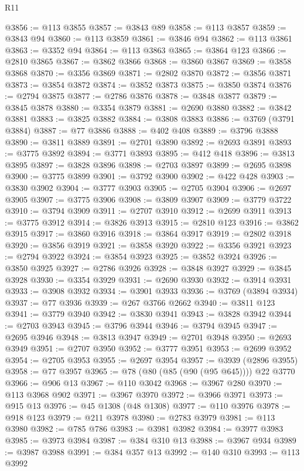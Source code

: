 \begin{lexlean}{R11}
\begin{coremodule}
{{{{{{{{{{{{{{{{{{{{{{{{{{{{{{{{{{{{{{{{{{{{{{{{{{{{{{{{{{{{{{{{{{{{{{{{{{{{{{{{{{{{{{{{{{{{{{{{{{{{{{{{{{@3856 := @113 @3855
@3857 := @3843 @89
@3858 := @113 @3857
@3859 := @3843 @94
@3860 := @113 @3859
@3861 := @3846 @94
@3862 := @113 @3861
@3863 := @3352 @94
@3864 := @113 @3863
@3865 := @3864 @123
@3866 := @2810 @3865
@3867 := @3862 @3866
@3868 := @3860 @3867
@3869 := @3858 @3868
@3870 := @3356 @3869
@3871 := @2802 @3870
@3872 := @3856 @3871
@3873 := @3854 @3872
@3874 := @3852 @3873
@3875 := @3850 @3874
@3876 := @2794 @3875
@3877 := @2786 @3876
@3878 := @3848 @3877
@3879 := @3845 @3878
@3880 := @3354 @3879
@3881 := @2690 @3880
@3882 := @3842 @3881
@3883 := @3825 @3882
@3884 := @3808 @3883
@3886 := @3769 (@3791 @3884)
@3887 := @77 @3886
@3888 := @402 @408
@3889 := @3796 @3888
@3890 := @3811 @3889
@3891 := @2701 @3890
@3892 := @2693 @3891
@3893 := @3775 @3892
@3894 := @3771 @3893
@3895 := @412 @418
@3896 := @3813 @3895
@3897 := @3828 @3896
@3898 := @2703 @3897
@3899 := @2695 @3898
@3900 := @3775 @3899
@3901 := @3792 @3900
@3902 := @422 @428
@3903 := @3830 @3902
@3904 := @3777 @3903
@3905 := @2705 @3904
@3906 := @2697 @3905
@3907 := @3775 @3906
@3908 := @3809 @3907
@3909 := @3779 @3722
@3910 := @3794 @3909
@3911 := @2707 @3910
@3912 := @2699 @3911
@3913 := @3775 @3912
@3914 := @3826 @3913
@3915 := @2810 @123
@3916 := @3862 @3915
@3917 := @3860 @3916
@3918 := @3864 @3917
@3919 := @2802 @3918
@3920 := @3856 @3919
@3921 := @3858 @3920
@3922 := @3356 @3921
@3923 := @2794 @3922
@3924 := @3854 @3923
@3925 := @3852 @3924
@3926 := @3850 @3925
@3927 := @2786 @3926
@3928 := @3848 @3927
@3929 := @3845 @3928
@3930 := @3354 @3929
@3931 := @2690 @3930
@3932 := @3914 @3931
@3933 := @3908 @3932
@3934 := @3901 @3933
@3936 := @3769 (@3894 @3934)
@3937 := @77 @3936
@3939 := @267 @3766 @2662
@3940 := @3811 @123
@3941 := @3779 @3940
@3942 := @3830 @3941
@3943 := @3828 @3942
@3944 := @2703 @3943
@3945 := @3796 @3944
@3946 := @3794 @3945
@3947 := @2695 @3946
@3948 := @3813 @3947
@3949 := @2701 @3948
@3950 := @2693 @3949
@3951 := @2707 @3950
@3952 := @3777 @3951
@3953 := @2699 @3952
@3954 := @2705 @3953
@3955 := @2697 @3954
@3957 := @3939 (@2896 @3955)
@3958 := @77 @3957
@3965 := @78 (@80 (@85 (@90 (@95 @645)))) @22 @3770
@3966 := @906 @13
@3967 := @110 @3042
@3968 := @3967 @280
@3970 := @113 @3968 @902
@3971 := @3967 @3970
@3972 := @3966 @3971
@3973 := @915 @13
@3976 := @45 @1308 (@48 @1308)
@3977 := @110 @3976
@3978 := @918 @123
@3979 := @211 @3978
@3980 := @2783 @3979
@3981 := @113 @3980
@3982 := @785 @786
@3983 := @3981 @3982
@3984 := @3977 @3983
@3985 := @3973 @3984
@3987 := @384 @310 @13
@3988 := @3967 @934
@3989 := @3987 @3988
@3991 := @384 @357 @13
@3992 := @140 @310
@3993 := @113 @3992
}}}}}}}}}}}}}}}}}}}}}}}}}}}}}}}}}}}}}}}}}}}}}}}}}}}}}}}}}}}}}}}}}}}}}}}}}}}}}}}}}}}}}}}}}}}}}}}}}}}}}}}}}}
\end{coremodule}
\end{lexlean}
